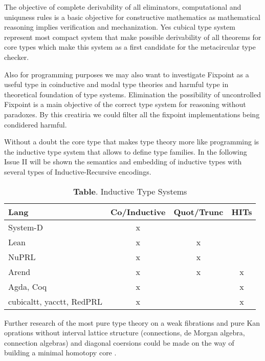\documentclass{article}
\theoremstyle{definition}
\begin{document}
The objective of complete derivability of all eliminators, computational and uniquness rules
is a basic objective for constructive mathematics as mathematical reasoning implies verification
and mechanization. Yes cubical type system represent most compact system that make possible
derivability of all theorems for core types which make this system as a first candidate for
the metacircular type checker.

Also for programming purposes we may also want to investigate Fixpoint as a useful
type in coinductive and modal type theories and harmful type in theoretical foundation of type systems.
Elimination the possibility of uncontrolled Fixpoint is a main objective of the correct type system
for reasoning without paradoxes. By this creatiria we could filter all the fixpoint implementations being condidered harmful.

Without a doubt the core type that makes type theory more
like programming is the inductive type system that allows to
define type families. In the following Issue II will be shown
the semantics and embedding of inductive types with several types
of Inductive-Recursive encodings.

\begin{table}[!ht]
  \centering
  \caption*{\textbf{Table}. Inductive Type Systems}
  \begin{adjustbox}{width=\columnwidth,center}
  \begin{tabular}{lccc}
    \hline
       Lang & Co/Inductive & Quot/Trunc & HITs\\
    \hline
       System-D & x\\
       Lean & x & x\\
       NuPRL & x & x\\
       Arend & x & x & x\\
       Agda, Coq & x & & x\\
       cubicaltt, yacctt, RedPRL & x & & x\\
  \end{tabular}
  \end{adjustbox}
\end{table}

Further research of the most pure type theory on a weak fibrations and pure Kan
oprations without interval lattice structure (connections, de Morgan algebra, connection
algebras) and diagonal coersions could be made on the way of building a minimal homotopy core \cite{Cavallo19}.
\end{document}
